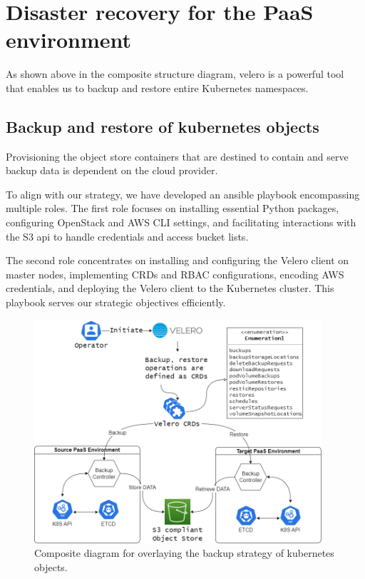 \section{Disaster recovery for the PaaS environment }

\hspace{7mm}As shown above in the composite structure diagram, velero is a powerful tool that enables us to backup and restore entire Kubernetes namespaces. 

\subsection{Backup and restore of kubernetes objects }

\hspace{7mm}Provisioning the object store containers that are destined to contain and serve backup data is dependent on the cloud provider.

\hspace{7mm}To align with our strategy, we have developed an ansible playbook encompassing multiple roles. The first role focuses on installing essential Python packages, configuring OpenStack and AWS CLI settings, and facilitating interactions with the S3 api to handle credentials and access bucket lists.

\hspace{7mm}The second role concentrates on installing and configuring the Velero client on master nodes, implementing CRDs and RBAC configurations, encoding AWS credentials, and deploying the Velero client to the Kubernetes cluster. This playbook serves our strategic objectives efficiently.

 \begin{figure}[H]\centering
\includegraphics[width=0.95\textwidth,angle=00]{assets/f57.png}
\caption{Composite diagram for overlaying the backup strategy of kubernetes objects.}
\label{fig:f57}
\end{figure}

